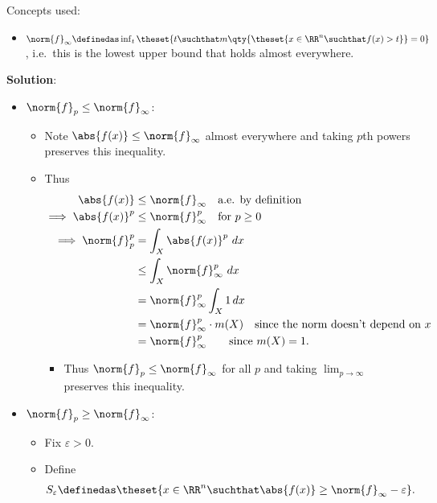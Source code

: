 \begin{solution}

Concepts used:

\begin{itemize}
\tightlist
\item
  \(\norm{f}_\infty \definedas \inf_t {\theset{ t\suchthat m\qty{\theset{x\in \RR^n \suchthat f(x) > t}} = 0 } }\),
  i.e.~this is the lowest upper bound that holds almost everywhere.
\end{itemize}

\textbf{Solution}:

\begin{itemize}
\tightlist
\item
  \(\norm{f}_p \leq \norm{f}_\infty\):

  \begin{itemize}
  \item
    Note \(\abs{f(x)} \leq \norm{f}_\infty\) almost everywhere and
    taking \(p\)th powers preserves this inequality.
  \item
    Thus \begin{align*}
    \abs{f(x)} &\leq \norm{f}_\infty \quad\text{a.e. by definition} \\
    \implies 
    \abs{f(x)}^p &\leq \norm{f}_\infty^p \quad\text{for } p\geq 0 \\  
    \implies
    \norm{f}_p^p 
    &= \int_X \abs{f(x)}^p ~dx \\
    &\leq \int_X \norm{f}_\infty^p ~dx  \\
    &= \norm{f}_\infty^p \int_X 1\,dx \\ 
    &= \norm{f}_\infty^p \cdot m(X) \quad\text{since the norm doesn't depend on }x \\
    &= \norm{f}_\infty^p \qquad \text{since } m(X) = 1
    .\end{align*}

    \begin{itemize}
    \tightlist
    \item
      Thus \(\norm{f}_p \leq \norm{f}_\infty\) for all \(p\) and taking
      \(\lim_{p\to\infty}\) preserves this inequality.
    \end{itemize}
  \end{itemize}
\item
  \(\norm{f}_p \geq \norm{f}_\infty\):

  \begin{itemize}
  \item
    Fix \(\varepsilon > 0\).
  \item
    Define \begin{align*}
    S_\varepsilon \definedas \theset{x\in \RR^n \suchthat \abs{f(x)} \geq \norm{f}_\infty - \varepsilon}
    .\end{align*}


\end{itemize}
\end{itemize}
\end{solution}
